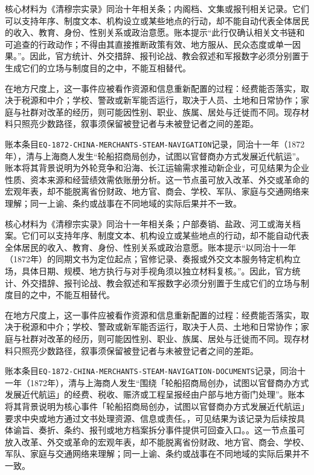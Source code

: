 核心材料为《清穆宗实录》同治十年相关条；内阁档、文集或报刊相关记录。它们可以支持年序、制度文本、机构设立或某些地点的行动，却不能自动代表全体居民的收入、教育、身份、性别关系或政治意愿。账本提示“此行仅确认相关文书链和可追查的行政动作；不得由其直接推断政策有效、地方服从、民众态度或单一因果。”。因此，官方统计、外交措辞、报刊论战、教会叙述和军报数字必须分别置于生成它们的立场与制度目的之中，不能互相替代。

在地方尺度上，这一事件应被看作资源和信息重新配置的过程：经费能否落实，取决于税源和中介；学校、警政或新军能否运行，取决于人员、土地和日常协作；家庭与社群对改革的经历，则可能因性别、职业、族属、居处与迁徙而不同。现存材料只照亮少数路径，叙事须保留被登记者与未被登记者之间的差距。

账本条目\texttt{EQ-1872-CHINA-MERCHANTS-STEAM-NAVIGATION}记录，同治十一年（1872年），清与上海商人发生“轮船招商局创办，试图以官督商办方式发展近代航运”。账本将其背景说明为外轮竞争和沿海、长江运输需求推动新企业，可见结果为企业性质、资本来源和经营绩效需依账册分析。这一节点虽可放入改革、外交或革命的宏观年表，却不能脱离省份财政、地方官、商会、学校、军队、家庭与交通网络来理解；同一上谕、条约或战事在不同地域的实际后果并不一致。

核心材料为《清穆宗实录》同治十一年相关条；户部奏销、盐政、河工或海关档案。它们可以支持年序、制度文本、机构设立或某些地点的行动，却不能自动代表全体居民的收入、教育、身份、性别关系或政治意愿。账本提示“以同治十一年（1872年）的同期文书为定位起点；官修记录、奏报或外交文本服务特定机构立场，具体日期、规模、地方执行与对手视角须以独立材料复核。”。因此，官方统计、外交措辞、报刊论战、教会叙述和军报数字必须分别置于生成它们的立场与制度目的之中，不能互相替代。

在地方尺度上，这一事件应被看作资源和信息重新配置的过程：经费能否落实，取决于税源和中介；学校、警政或新军能否运行，取决于人员、土地和日常协作；家庭与社群对改革的经历，则可能因性别、职业、族属、居处与迁徙而不同。现存材料只照亮少数路径，叙事须保留被登记者与未被登记者之间的差距。

账本条目\texttt{EQ-1872-CHINA-MERCHANTS-STEAM-NAVIGATION-DOCUMENTS}记录，同治十一年（1872年），清与上海商人发生“围绕「轮船招商局创办，试图以官督商办方式发展近代航运」的经费、税收、赈济或工程呈报经由户部与地方衙门处理”。账本将其背景说明为核心事件「轮船招商局创办，试图以官督商办方式发展近代航运」要求中央或地方通过文书处理资源、信息或责任。，可见结果为该记录为后续按具体谕旨、奏折、条约、报刊或地方档案拆分事件提供可回查入口。。这一节点虽可放入改革、外交或革命的宏观年表，却不能脱离省份财政、地方官、商会、学校、军队、家庭与交通网络来理解；同一上谕、条约或战事在不同地域的实际后果并不一致。

